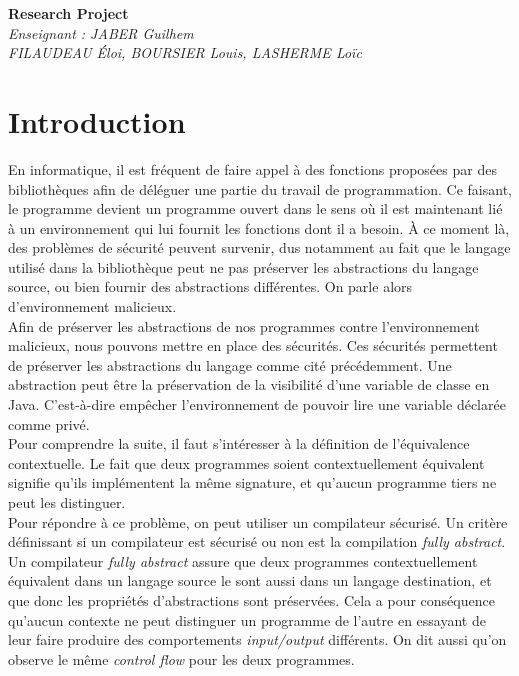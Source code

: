 \documentclass[11pt, a4paper, notitlepage]{article}
\newcommand\tab{{\hspace*{12.5mm}}}
\begin{document}
\begin{center}
   \huge\textbf{Research Project}\\
   \vspace*{3mm}
   \large\textit{Enseignant : JABER Guilhem}\\
   \large\textit{FILAUDEAU Éloi, BOURSIER Louis, LASHERME Loïc}
\end{center}
\vspace*{2mm}

\section{Introduction}
\tab En informatique, il est fréquent de faire appel à des fonctions proposées par des bibliothèques afin de déléguer une partie du travail de programmation. Ce faisant, le programme devient un programme ouvert dans le sens où il est maintenant lié à un environnement qui lui fournit les fonctions dont il a besoin. À ce moment là, des problèmes de sécurité peuvent survenir, dus notamment au fait que le langage utilisé dans la bibliothèque peut ne pas préserver les abstractions du langage source, ou bien fournir des abstractions différentes. On parle alors d’environnement malicieux.\\
\tab Afin de préserver les abstractions de nos programmes contre l'environnement malicieux, nous pouvons mettre en place des sécurités. Ces sécurités permettent de préserver les abstractions du langage comme cité précédemment. Une abstraction peut être la préservation de la visibilité d'une variable de classe en Java. C'est-à-dire empêcher l'environnement de pouvoir lire une variable déclarée comme privé.\\
\tab Pour comprendre la suite, il faut s'intéresser à la définition de l'équivalence contextuelle. Le fait que deux programmes soient contextuellement équivalent signifie qu'ils implémentent la même signature, et qu'aucun programme tiers ne peut les distinguer.\\
\tab Pour répondre à ce problème, on peut utiliser un compilateur sécurisé. Un critère définissant si un compilateur est sécurisé ou non est la compilation \textit{fully abstract}. Un compilateur \textit{fully abstract} assure que deux programmes contextuellement équivalent dans un langage source le sont aussi dans un langage destination, et que donc les propriétés d’abstractions sont préservées. Cela a pour conséquence qu’aucun contexte ne peut distinguer un programme de l’autre en essayant de leur faire produire des comportements \textit{input/output} différents. On dit aussi qu’on observe le même \textit{control flow} pour les deux programmes.\\
\end{document}

